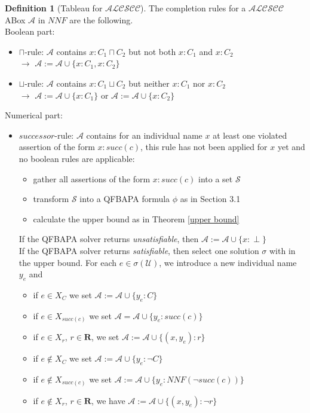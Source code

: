 \documentclass{book}
\theoremstyle{break}
\theoremstyle{definition}
\newtheorem{mydef}{Definition}
\begin{document}
\begin{mydef}[Tableau for $\mathcal{ALCSCC}$]
The completion rules for a $\mathcal{ALCSCC}$ ABox $\mathcal{A}$ in $NNF$ are the following.\\
Boolean part:
\begin{itemize}
\item\label{cap} $\sqcap$-rule: $\mathcal{A}$ contains $x:C_1\sqcap C_2$ but not both $x:C_1$ and $x:C_2$\\
$\rightarrow$ $\mathcal{A}:=\mathcal{A}\cup\{x:C_1, x:C_2\}$
\item\label{cup} $\sqcup$-rule: $\mathcal{A}$ contains $x:C_1\sqcup C_2$ but neither $x:C_1$ nor $x:C_2$\\
$\rightarrow$ $\mathcal{A}:=\mathcal{A}\cup\{x:C_1\}$ or $\mathcal{A}:=\mathcal{A}\cup\{x:C_2\}$
\end{itemize}
Numerical part:
\begin{itemize}
\item\label{succ} $successor$-rule: $\mathcal{A}$ contains for an individual name $x$ at least one violated assertion of the form $x:succ(c)$, this rule has not been applied for $x$ yet and no boolean rules are applicable:
\begin{itemize}
\item gather all assertions of the form $x:succ(c)$ into a set $\mathcal{S}$
\item transform $\mathcal{S}$ into a QFBAPA formula $\phi$ as in Section 3.1
\item calculate the upper bound as in Theorem \ref{upper bound}
\end{itemize}
If the QFBAPA solver returns \textit{unsatisfiable}, then $\mathcal{A}:=\mathcal{A}\cup\{x:\perp\}$\\
If the QFBAPA solver returns \textit{satisfiable}, then select one solution $\sigma$ with in the upper bound. For each $e\in\sigma(\mathcal{U})$, we introduce a new individual name $y_e$ and
\begin{itemize}
\item if $e\in X_C$ we set $\mathcal{A}:=\mathcal{A}\cup\{y_e:C\}$
\item if $e\in X_{succ(c)}$ we set $\mathcal{A}=\mathcal{A}\cup\{y_e:succ(c)\}$
\item if $e\in X_r$, $r\in\mathbf{R}$, we set $\mathcal{A}:=\mathcal{A}\cup\{(x,y_e):r\}$
\item if $e\notin X_C$ we set $\mathcal{A}:=\mathcal{A}\cup\{y_e:\neg C\}$
\item if $e\notin X_{succ(c)}$ we set $\mathcal{A}:=\mathcal{A}\cup\{y_e: NNF(\neg succ(c))\}$
\item if $e\notin X_r$, $r\in\mathbf{R}$, we have $\mathcal{A}:=\mathcal{A}\cup\{(x,y_e):\neg r\}$
\end{itemize}
\end{itemize}
\end{mydef}
\end{document}
